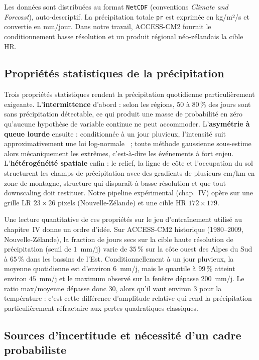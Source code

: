 Les données sont distribuées au format \texttt{NetCDF} (conventions \emph{Climate and Forecast}), auto-descriptif. La précipitation totale \texttt{pr} est exprimée en kg/m²/s et convertie en mm/jour. Dans notre travail, ACCESS-CM2 fournit le conditionnement basse résolution et un produit régional néo-zélandais la cible HR.

\subsection{Propriétés statistiques de la précipitation}
\label{ssec:stats-precip}

Trois propriétés statistiques rendent la précipitation quotidienne particulièrement exigeante. L'\textbf{intermittence} d'abord : selon les régions, 50 à 80\,\% des jours sont sans précipitation détectable, ce qui produit une masse de probabilité en zéro qu'aucune hypothèse de variable continue ne peut accommoder. L'\textbf{asymétrie à queue lourde} ensuite : conditionnée à un jour pluvieux, l'intensité suit approximativement une loi log-normale~\cite{maraun_widmann_2018} ; toute méthode gaussienne sous-estime alors mécaniquement les extrêmes, c'est-à-dire les événements à fort enjeu. L'\textbf{hétérogénéité spatiale} enfin : le relief, la ligne de côte et l'occupation du sol structurent les champs de précipitation avec des gradients de plusieurs cm/km en zone de montagne, structure qui disparaît à basse résolution et que tout downscaling doit restituer. Notre pipeline expérimental (chap.~IV) opère sur une grille LR $23 \times 26$ pixels (Nouvelle-Zélande) et une cible HR $172 \times 179$.

Une lecture quantitative de ces propriétés sur le jeu d'entraînement utilisé au chapitre~IV donne un ordre d'idée. Sur ACCESS-CM2 historique (1980--2009, Nouvelle-Zélande), la fraction de jours secs sur la cible haute résolution de précipitation (seuil de $1$~mm/j) varie de $35\,\%$ sur la côte ouest des Alpes du Sud à $65\,\%$ dans les bassins de l'Est. Conditionnellement à un jour pluvieux, la moyenne quotidienne est d'environ $6$~mm/j, mais le quantile à 99\,\% atteint environ $45$~mm/j et le maximum observé sur la fenêtre dépasse $200$~mm/j. Le ratio max/moyenne dépasse donc 30, alors qu'il vaut environ 3 pour la température : c'est cette différence d'amplitude relative qui rend la précipitation particulièrement réfractaire aux pertes quadratiques classiques.

\subsection{Sources d'incertitude et nécessité d'un cadre probabiliste}
\label{ssec:incertitudes}


